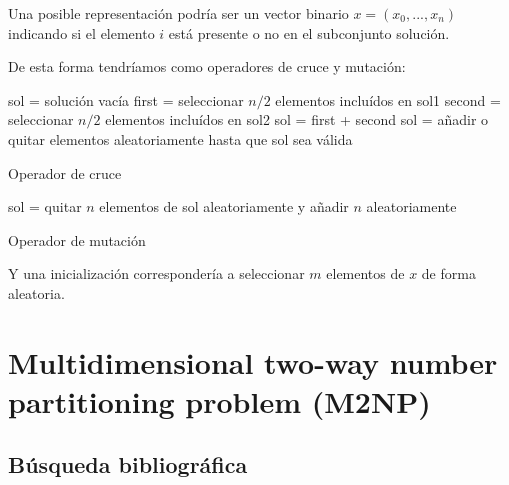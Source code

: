 \documentclass[13pt,a4paper]{article}
\begin{document}
Una posible representación podría ser un vector binario $x = (x_{0}, ..., x_{n})$ indicando si el elemento $i$ está presente o no en el subconjunto solución.

\vspace{\baselineskip}

De esta forma tendríamos como operadores de cruce y mutación:

\begin{algorithm}[H]
    \SetAlgoLined
        sol = solución vacía \;
        first = seleccionar $n/2$ elementos incluídos en sol1 \;
        second = seleccionar $n/2$ elementos incluídos en sol2 \;
        sol = first + second \;        
        sol = añadir o quitar elementos aleatoriamente hasta que sol sea válida \;
    \caption{Operador de cruce}
\end{algorithm}

\vspace{\baselineskip}

\begin{algorithm}[H]
    \SetAlgoLined
        sol = quitar $n$ elementos de sol aleatoriamente y añadir $n$ aleatoriamente \;
    \caption{Operador de mutación}
\end{algorithm}

\vspace{\baselineskip}

Y una inicialización correspondería a seleccionar $m$ elementos de $x$ de forma aleatoria.

\newpage

\section{Multidimensional two-way number partitioning problem (M2NP)}

\subsection{Búsqueda bibliográfica}

\end{document}
